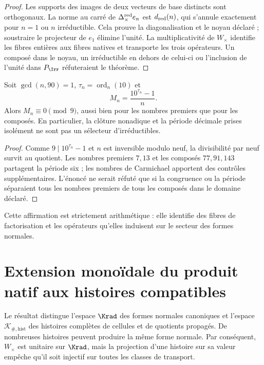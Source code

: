 \begin{proof}
Les supports des images de deux vecteurs de base distincts sont orthogonaux.
La norme au carré de
\(\Delta_\times^{\rm red}e_n\) est \(d_{\rm red}(n)\), qui s'annule
exactement pour \(n=1\) ou \(n\) irréductible. Cela prouve la diagonalisation
et le noyau déclaré ; soustraire le projecteur de \(e_1\) élimine l'unité.
La multiplicativité de \(W_\times\) identifie les fibres entières aux
fibres natives et transporte les trois opérateurs. Un composé dans le noyau,
un irréductible en dehors de celui-ci ou l'inclusion de l'unité dans \(P_{\Irr}\)
réfuteraient le théorème.
\end{proof}

\begin{proposition}
\label{int:pf84:B05}
Soit \(\gcd(n,90)=1\),
\(\tau_n=\operatorname{ord}_n(10)\) et
\[
 M_n=\frac{10^{\tau_n}-1}{n}.
\]
Alors \(M_n\equiv0\pmod9\), aussi bien pour les nombres premiers que pour les composés. En
particulier, la clôture nonadique et la période décimale prises isolément ne sont pas un
sélecteur d'irréductibles.
\end{proposition}

\begin{proof}
Comme \(9\mid10^{\tau_n}-1\) et \(n\) est inversible modulo neuf, la
divisibilité par neuf survit au quotient. Les nombres premiers \(7,13\) et les
composés \(77,91,143\) partagent la période six ; les nombres de Carmichael
apportent des contrôles supplémentaires. L'énoncé ne serait réfuté que si la
congruence ou la période séparaient tous les nombres premiers de tous les composés
dans le domaine déclaré.
\end{proof}

Cette affirmation est strictement arithmétique : elle identifie des fibres de
factorisation et les opérateurs qu'elles induisent sur le secteur des formes
normales.

\ifdefined\HMTInternalTraceability
\section{Extension monoïdale du produit natif aux histoires compatibles}
\label{int:pf84:SYN-05D-HIST}

Le résultat distingue l'espace \(\Krad\) des formes normales canoniques et
l'espace \(\mathcal K_{\#,\mathrm{hist}}\) des histoires complètes de
cellules et de quotients propagés.
De nombreuses histoires peuvent produire la même forme normale. Par conséquent,
$W_\times$ est unitaire sur $\Krad$, mais la projection d'une histoire sur
sa valeur empêche qu'il soit injectif sur toutes les classes de transport.

